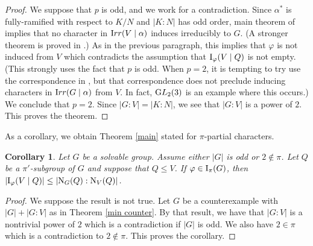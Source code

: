 \documentclass[12pt]{article}
\newtheorem{corollary}[theorem]{Corollary}
\def\irr#1{{\textrm  Irr}(#1)}
\def\norm#1#2{{\textrm N}_{#1} (#2)}
\def\B#1#2{{\textrm B}_{#1} (#2)}
\def\Bpi#1{\B {\pi}{#1}}
\def\D#1#2{{\textrm D}_{#1} (#2)}
\def\Dpi#1{\D {\pi} {#1}}
\def\I#1#2{{\textrm I}_{#1} (#2)}
\def\Ipi#1{\I {\pi}{#1}}
\def\phi{\varphi}
\newcommand \IIpi[3] {{\textrm I}_{#1} (#2 \mid #3)}
\begin{document}
\begin{proof}
We suppose that $p$ is odd, and we work for a contradiction.  Since
$\alpha^*$ is fully-ramified with respect to $K/N$ and $|K:N|$ has
odd order, main theorem of \cite{fram} implies that no character in
$\irr {V \mid \alpha}$ induces irreducibly to $G$.  (A stronger
theorem is proved in \cite{brown}.) As in the previous paragraph,
this implies that $\phi$ is not induced from $V$ which contradicts
the assumption that $\IIpi {\phi}VQ$ is not empty. (This strongly
uses the fact that $p$ is odd. When $p = 2$, it is tempting to try
use the correspondence in \cite{strong}, but that correspondence
does not preclude inducing characters in $\irr {G \mid \alpha}$ from
$V$. In fact, ${\textrm GL}_2 (3)$ is an example where this occurs.) We
conclude that $p = 2$. Since $|G:V| = |K:N|$, we see that $|G:V|$ is
a power of $2$. This proves the theorem.
\end{proof}

As a corollary, we obtain Theorem \ref{main} stated for
$\pi$-partial characters.

\begin{corollary}
Let $G$ be a solvable group.  Assume either $|G|$ is odd or $2
\not\in \pi$.  Let $Q$ be a $\pi'$-subgroup of $G$ and suppose that
$Q \le V$.  If $\phi \in \Ipi G$, then $|\IIpi {\phi}VQ| \le |\norm
GQ:\norm VQ|$.
\end{corollary}

\begin{proof}
We suppose the result is not true.  Let $G$ be a counterexample with
$|G| + |G:V|$ as in Theorem \ref{min counter}.  By that result, we
have that $|G:V|$ is a nontrivial power of $2$ which is a
contradiction if $|G|$ is odd.  We also have $2 \in \pi$ which is a
contradiction to $2 \not\in \pi$.  This proves the corollary.
\end{proof}
\end{document}
